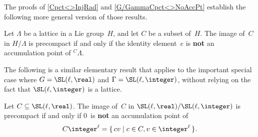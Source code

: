The proofs of \cref{Cpct<>InjRad} and
\cref{G/GammaCpct<>NoAccPt} establish the following
more general version of those results.

\begin{prop} \label{diverge<>contract}
 Let $\Lambda$ be a lattice in a Lie group~$H$, and let
$C$ be a subset of~$H$. The image of~$C$ in $H/\Lambda$ is 
precompact if and only if the identity
element~$e$ is \textbf{not} an accumulation point of\/
${}^C \! \Lambda$.
 \end{prop}

The following is a similar elementary result that applies
to the important special case where $G = \SL(\ell,\real)$
and $\Gamma = \SL(\ell,\integer)$, without relying on the
fact that $\SL(\ell,\integer)$ is a lattice. 

\begin{prop}
\label{MahlerCpct}
 Let $C \subseteq \SL(\ell,\real)$. The image of~$C$ in\/
$\SL(\ell,\real)/\SL(\ell,\integer)$ is precompact if and
only if\/ $0$~is \textbf{not} an accumulation point of 
 $$ C \integer^\ell = \{\, cv \mid c \in C, v \in
\integer^\ell  \,\} .$$
 \end{prop}

